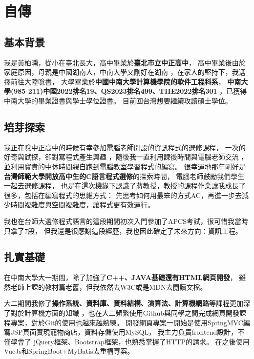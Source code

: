 \documentclass[classical]{einfart}
\begin{document}
\section{自傳}

\subsection{基本背景}

我是黃柏曛，從小在臺北長大，高中畢業於\textbf{臺北市立中正高中}，
高中畢業後由於家庭原因，母親是中國湖南人，中南大學又剛好在湖南
，在家人的堅持下，我選擇前往大陸唸書，
大學畢業於\textbf{中國中南大學計算機學院的軟件工程科系}，
\textbf{中南大學(985 211)中國2022排名19、QS2023排名499、THE2022排名301}
，已獲得中南大學的畢業證書與學士學位證書。
目前回台灣想要繼續攻讀碩士學位。

\subsection{培芽探索}

我正在唸中正高中的時候有幸參加電腦老師開設的資訊程式的選修課程，
一次的好奇與試探，卻對寫程式產生興趣
，隨後我一直利用課後時間與電腦老師交流
，並利用寶貴的中休時間親自跑到電腦教室學習程式的編寫。
很幸運地那年剛好是\textbf{台灣師範大學開放高中生的C語言程式選修}的探索時間，
電腦老師鼓勵我們學生一起去選修課程，
也是在這次機緣下認識了蔣教授，教授的課程作業讓我成長了很多，包括在編寫程式的思維方式：
先思考如何用最笨的方式AC，再進一步去減少時間複雜度與空間複雜度，讓程式更有效運行。

我也在台師大選修程式語言的這段期間初次入門參加了APCS考試，很可惜我當時只拿了7段，
但我還是很感謝這段經歷，我也因此確定了未來方向：資訊工程。

\subsection{扎實基礎}

在中南大學大一期間，除了加強了\textbf{C++、JAVA基礎還有HTML網頁開發}，
雖然老師上課的教材篇老舊，但我依然去W3C或是MDN去閱讀文檔。

大二期間我修了\textbf{操作系統、資料庫、資料結構、演算法、計算機網路}等課程更加深了對於計算機方面的知識
，也在大二頻繁使用Github與同學之間完成網頁開發課程專案，對於Git的使用也越來越熟練。
開發網頁專案一開始是使用SpringMVC編寫JSP頁面實現寵物商店，資料存儲使用MySQL，
我主力負責frontend設計，不僅學會了
jQuery框架、Bootstrap框架，也熟悉掌握了HTTP的請求。
在之後使用VueJs和SpringBoot+MyBatis去重構專案。
\end{document}
